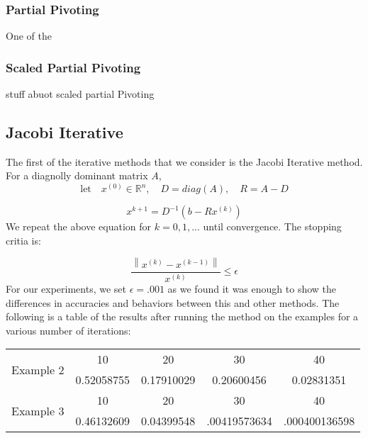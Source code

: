 \documentclass[11pt]{article}	%
\newcommand\norm[1]{\left\lVert#1\right\rVert}
\begin{document}
    \subsubsection{Partial Pivoting}
    One of the 

    \subsubsection{Scaled Partial Pivoting}
    stuff abuot scaled partial Pivoting


\subsection{Jacobi Iterative}
    The first of the iterative methods that we consider is the Jacobi Iterative method. For a diagnolly dominant matrix $A$,
    \begin{equation}\label{eq:jacobi-eq-1-qualifier}
        \textrm{let} \quad x^{(0)}\in {\mathbb R}^n,\quad D = diag(A),\quad R = A - D
    \end{equation}

    \begin{equation}\label{eq:jacobi-eq-1}
        x^{k+1} = D^{-1}(b- Rx^{(k)})
    \end{equation}
    We repeat the above equation for $k = 0, 1, ...$ until convergence. The stopping critia is:

    \begin{equation}
        \frac{\norm{x^{(k)} - x^{(k-1)}}}{x^{(k)}} \leq \epsilon
    \end{equation}
    For our experiments, we set $\epsilon = .001$ as we found it was enough to show the differences in accuracies and behaviors between this and other methods. The following is a table of the results after running the method on the examples for a various number of iterations:
    \begin{center}
        \begin{tabular}{||c|c|c|c|c||}
            \hline
            \multirow{2}{5em}{Example 2} & 10 & 20 & 30 & 40 \\ [.25em]
            & 0.52058755 & 0.17910029 & 0.20600456 & 0.02831351 \\ [.25em]
            \hline \hline
            \multirow{2}{5em}{Example 3} & 10 & 20 & 30 & 40 \\ [.25em]
            & 0.46132609 & 0.04399548 & .00419573634 & .000400136598 \\ [.25em]
            \hline
        \end{tabular}
    \end{center}
\end{document}
